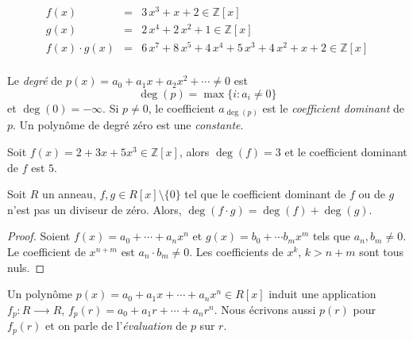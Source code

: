 \begin{example} 
  \label{exe:33}
  \begin{eqnarray*}
    f(x) & = &  3 \, x^{3} + x + 2 ∈ ℤ[x]  \\
    g(x) & = & 2 \, x^{4} + 2 \, x^{2} + 1  ∈ ℤ[x] \\
    f(x) ⋅g(x) & = & 6 \, x^{7} + 8 \, x^{5} + 4 \, x^{4} + 5 \, x^{3} + 4 \,  x^{2} + x + 2   ∈ ℤ[x] \\ 
  \end{eqnarray*}
\end{example}




\begin{definition}
  \label{def:52}
Le \emph{degré} de $p(x) = a_0 + a_1x + a_2x^2 + \cdots \neq 0$ est 
\begin{displaymath}
  \deg(p) = \max\{i \colon  a_i \neq 0\}
\end{displaymath}
et $\deg(0) = -\infty$. 
Si $p \neq 0$, le coefficient $a_{\deg(p)}$ est le \emph{coefficient dominant} de $p$. 
Un polynôme de degré zéro est une \emph{constante}.
\end{definition}

\begin{example}
  \label{exe:35}
  Soit $f(x) = 2 + 3x + 5x^3 ∈ ℤ[x]$, alors $\deg(f) =3$  et le coefficient dominant de $f$ est $5$. 
\end{example}

\begin{theorem}
  \label{thr:34} Soit $R$ un anneau,   $f,g \in R[x] \setminus \{0\}$ tel que le coefficient dominant de $f$ ou de $g$ n'est pas un diviseur de zéro.  Alors, $\deg(f \cdot g) = \deg(f) + \deg(g)$. 
\end{theorem}
\begin{proof}
  
  Soient $f(x) = a_0 + \cdots + a_n x^n$ et $g(x) = b_0+ \cdots b_m x^m$ tels que $a_n, b_m  \neq 0$. Le coefficient de $x^{n+m}$  est $a_n \cdot  b_m \neq 0$. Les coefficients de $x^k$, $k> n+m$ sont tous nuls.  
\end{proof}

Un polynôme $p(x) = a_0 + a_1 x + \cdots + a_n x^n ∈ R[x]$ induit une application $f_p:  R ⟶ R$, $f_p(r) = a_0+ a_1 r+ \cdots + a_n r^n$. Nous écrivons aussi $p(r)$ pour $f_p(r)$ et on parle de l'\emph{évaluation} de $p$ sur $r$. 

